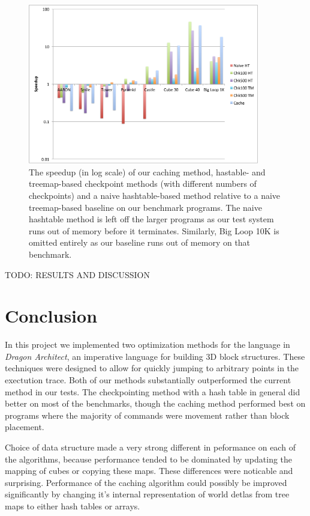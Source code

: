 \documentclass{sig-alternate}
\newcommand{\da}{\emph{Dragon Architect}}
\newcommand{\todo}[1]{{\color{red} TODO: #1}}
\begin{document}
\begin{figure}[ht!]
  \centering
  \includegraphics[width=0.9\textwidth]{images/all-speedup}
  \caption{The speedup (in log scale) of our caching method, hastable- and treemap-based checkpoint methods (with different numbers of checkpoints) and a naive hashtable-based method relative to a naive treemap-based baseline on our benchmark programs. The naive hashtable method is left off the larger programs as our test system runs out of memory before it terminates. Similarly, Big Loop 10K is omitted entirely as our baseline runs out of memory on that benchmark.}
  \label{fig:all-speedup}
\end{figure}


\todo{RESULTS AND DISCUSSION}

\section{Conclusion}

In this project we implemented two optimization methods for the language in \da, an imperative language for building 3D block structures. These techniques were designed to allow for quickly jumping to arbitrary points in the exectution trace. Both of our methods substantially outperformed the current method in our tests. The checkpointing method with a hash table in general did better on most of the benchmarks, though the caching method performed best on programs where the majority of commands were movement rather than block placement.

Choice of data structure made a very strong different in peformance on each of the algorithms, because performance tended to be dominated by updating the mapping of cubes or copying these maps. These differences were noticable and surprising. Performance of the caching algorithm could possibly be improved significantly by changing it's internal representation of world detlas from tree maps to either hash tables or arrays.
\end{document}
